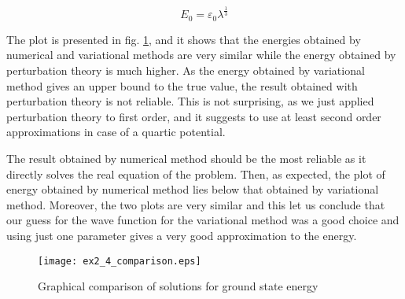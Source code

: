 \documentclass{article}
\begin{document}
\begin{equation}
E_0 = \varepsilon_0 \lambda^{\frac{1}{3}}
\end{equation}

The plot is presented in fig. \ref{ex2_4_comparison}, and it shows that the energies obtained by numerical and variational methods are very similar while the energy obtained by perturbation theory is much higher. As the energy obtained by variational method gives an upper bound to the true value, the result obtained with perturbation theory is not reliable. This is not surprising, as we just applied perturbation theory to first order, and it suggests to use at least second order approximations in case of a quartic potential.

The result obtained by numerical method should be the most reliable as it directly solves the real equation of the problem. Then, as expected, the plot of energy obtained by numerical method lies below that obtained by variational method. Moreover, the two plots are very similar and this let us conclude that our guess for the wave function for the variational method was a good choice and using just one parameter gives a very good approximation to the energy.

\begin{figure}
\centering
\texttt{[image: ex2\_4\_comparison.eps]}
\caption{Graphical comparison of solutions for ground state energy}
\label{ex2_4_comparison}
\end{figure}
\end{document}
